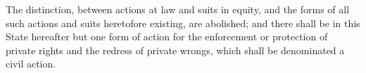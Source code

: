 The distinction, between actions at law and suits in equity, and the forms of all such actions and suits heretofore existing, are abolished; and there shall be in this State hereafter but one form of action for the enforcement or protection of private rights and the redress of private wrongs, which shall be denominated a civil action.